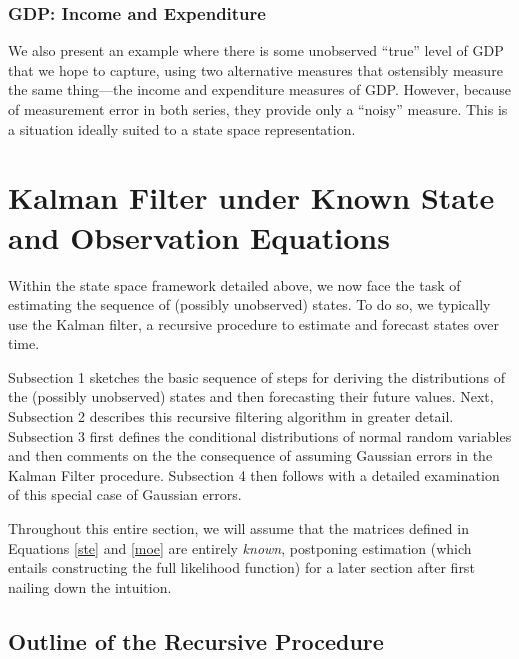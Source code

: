 \documentclass[a4paper,12pt]{article}
\begin{document}
\subsubsection{GDP: Income and Expenditure}
We also present an example where there is some unobserved ``true'' level of GDP that we hope to capture, using two alternative measures that ostensibly measure the same thing---the income and expenditure measures of GDP. However, because of measurement error in both series, they provide only a ``noisy'' measure. This is a situation ideally suited to a state space representation.


\newpage
\section{Kalman Filter under Known State and Observation Equations}

Within the state space framework detailed above, we now face the task of estimating the sequence of (possibly unobserved) states. To do so, we typically use the Kalman filter, a recursive procedure to estimate and forecast states over time. 

Subsection 1 sketches the basic sequence of steps for deriving the distributions of the (possibly unobserved) states and then forecasting their future values. Next, Subsection 2 describes this recursive filtering algorithm in greater detail. Subsection 3 first defines the conditional distributions of normal random variables and then comments on the the consequence of assuming Gaussian errors in the Kalman Filter procedure. Subsection 4 then follows with a detailed examination of this special case of Gaussian errors.

Throughout this entire section, we will assume that the matrices defined in Equations \ref{ste} and \ref{moe} are entirely \emph{known}, postponing estimation (which entails constructing the full likelihood function) for a later section after first nailing down the intuition. 

\subsection{Outline of the Recursive Procedure}
\end{document}
